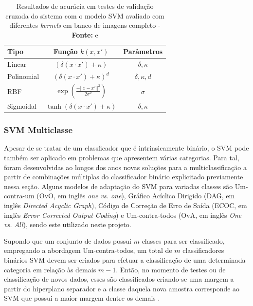 \begin{table}[h]
 \centering
 \begin{tabular}{l|c|c}
    Tipo & Função $k(x,x')$ & Parâmetros\\
  \hline
  Linear &  $(\delta(x \cdot x') + \kappa)$ & $\delta,\kappa$ \\
  Polinomial &  $(\delta(x \cdot x') + \kappa)^d$ & $\delta,\kappa, d$  \\
  RBF & $\exp(\frac{-||x - x'||^2}{2\sigma^2})$ & $\sigma$ \\
  Sigmoidal & $\tanh(\delta(x \cdot x') + \kappa)$ & $\delta,\kappa$ \\
 \end{tabular}
 \caption{Resultados de acurácia em testes de validação cruzada do sistema com o modelo SVM avaliado com diferentes \textit{kernels} em banco de imagens completo - \textbf{Fonte:}  e }
 \label{tab:svmkernel}
\end{table}

\subsubsection{SVM Multiclasse}

Apesar de se tratar de um classficador que é intrinsicamente binário, o SVM pode também ser aplicado em problemas que apresentem várias categorias. Para tal, foram desenvolvidas ao longos dos anos novas soluções para a multiclassificação a partir de combinações múltiplas do classificador binário explicitado previamente nessa seção. Alguns modelos de adaptação do SVM para variadas classes são Um-contra-um (OvO, em inglês \textit{one vs. one}), Gráfico Acíclico Dirigido (DAG, em inglês \textit{Directed Acyclic Graph}), Código de Correção de Erro de Saída (ECOC, em inglês \textit{Error Corrected Output Coding}) e Um-contra-todos (OvA, em inglês \textit{One vs. All}), sendo este utilizado neste projeto.

Supondo que um conjunto de dados possui $m$ classes para ser classificado, empregando a abordagem Um-contra-todos, um total de $m$ classificadores binários SVM devem ser criados para efetuar a classificação de uma determinada categoria em relação às demais $m-1$. Então, no momento de testes ou de classificação de novos dados, esses são classificados criando-se uma margem a partir do hiperplano separador e a classe daquela nova amostra corresponde ao SVM que possui a maior margem dentre os demais  .

